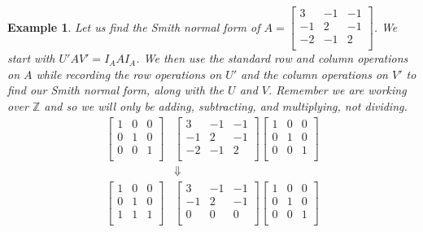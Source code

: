 \documentclass[11pt]{amsart}
\theoremstyle{plain}
\newtheorem{exa}{Example}
\theoremstyle{definition}
\begin{document}
\begin{exa}
  Let us find the Smith normal form of
  $
  A=\left[\begin{array}{rrr}
  3&-1&-1\\
  -1&2&-1\\
  -2&-1&2\\
  \end{array}\right]
  $. We start with $U'AV'=I_AAI_A$. We then use the standard row and column
  operations on $A$ while recording the row operations on $U'$ and the
  column operations on $V'$ to find our Smith normal form, along with the
  $U$ and $V$. Remember we are working over $\mathbb{Z}$ and so we will only be adding, subtracting, and multiplying, not dividing.
  \begin{align*}
  \left[\begin{array}{rrr}
  1&0&0\\
  0&1&0\\
  0&0&1\\
  \end{array}\right]
  &
  \left[\begin{array}{rrr}
  3&-1&-1\\
  -1&2&-1\\
  -2&-1&2\\
  \end{array}\right]
  \left[\begin{array}{rrr}
  1&0&0\\
  0&1&0\\
  0&0&1\\
  \end{array}\right]\\
  &\Downarrow\\
  \left[\begin{array}{rrr}
  1&0&0\\
  0&1&0\\
  1&1&1\\
  \end{array}\right]
  &
  \left[\begin{array}{rrr}
  3&-1&-1\\
  -1&2&-1\\
  0&0&0\\
  \end{array}\right]
  \left[\begin{array}{rrr}
  1&0&0\\
  0&1&0\\
  0&0&1\\
  \end{array}\right]\\

\end{align*}
\end{exa}
\end{document}
